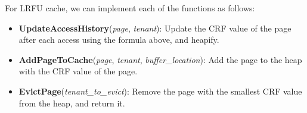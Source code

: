For LRFU cache, we can implement each of the functions as follows:

\begin{itemize}
    \item \textbf{UpdateAccessHistory}(\textit{page}, \textit{tenant}): Update the CRF value of the page after each access using the formula above, and heapify.
    \item \textbf{AddPageToCache}(\textit{page}, \textit{tenant}, \textit{buffer\_location}): Add the page to the heap with the CRF value of the page.
    \item \textbf{EvictPage}(\textit{tenant\_to\_evict}): Remove the page with the smallest CRF value from the heap, and return it.
\end{itemize}

\newpage


